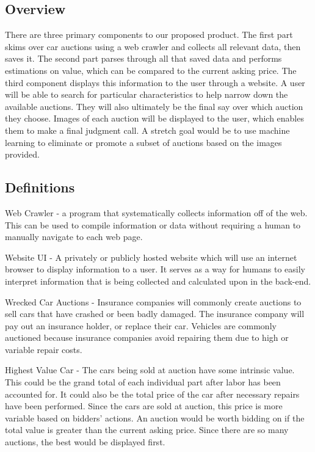 \documentclass[onecolumn, draftclsnofoot,10pt, compsoc]{IEEEtran}
\begin{document}
\subsection{Overview}
There are three primary components to our proposed product. The first part skims over car auctions using a web crawler and collects all relevant data, then saves it. The second part parses through all that saved data and performs estimations on value, which can be compared to the current asking price. The third component displays this information to the user through a website. A user will be able to search for particular characteristics to help narrow down the available auctions. They will also ultimately be the final say over which auction they choose. Images of each auction will be displayed to the user, which enables them to make a final judgment call. A stretch goal would be to use machine learning to eliminate or promote a subset of auctions based on the images provided.

\subsection{Definitions}
Web Crawler - a program that systematically collects information off of the web. This can be used to compile information or data without requiring a human to manually navigate to each web page. 

Website UI - A privately or publicly hosted website which will use an internet browser to display information to a user. It serves as a way for humans to easily interpret information that is being collected and calculated upon in the back-end. 

Wrecked Car Auctions - Insurance companies will commonly create auctions to sell cars that have crashed or been badly damaged. The insurance company will pay out an insurance holder, or replace their car. Vehicles are commonly auctioned because insurance companies avoid repairing them due to high or variable repair costs. 

Highest Value Car - The cars being sold at auction have some intrinsic value. This could be the grand total of each individual part after labor has been accounted for. It could also be the total price of the car after necessary repairs have been performed. Since the cars are sold at auction, this price is more variable based on bidders' actions. An auction would be worth bidding on if the total value is greater than the current asking price. Since there are so many auctions, the best would be displayed first. 
\end{document}
